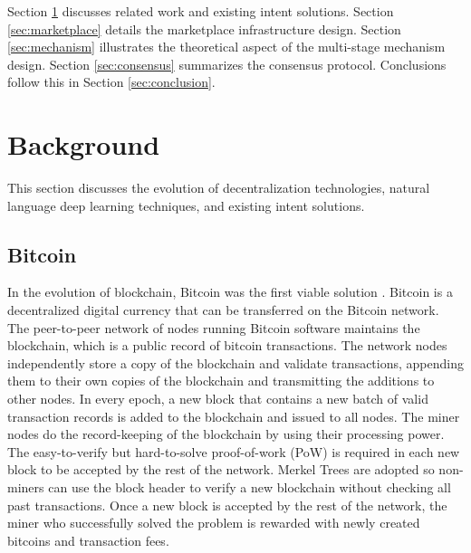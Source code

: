 \documentclass[11pt,letterpaper,twocolumn]{article}
\begin{document}
Section \ref{sec:background} discusses related work and existing intent solutions.
Section \ref{sec:marketplace} details the marketplace infrastructure design.
Section \ref{sec:mechanism} illustrates the theoretical aspect of the multi-stage mechanism
design. Section \ref{sec:consensus} summarizes the consensus protocol. Conclusions follow this in Section \ref{sec:conclusion}.

\section{Background}
\label{sec:background}
This section discusses the evolution of decentralization technologies, natural language deep learning techniques, and existing intent solutions. 

\subsection{Bitcoin}
In the evolution of blockchain, Bitcoin was the first viable solution \cite{nakamoto2008bitcoin}.
Bitcoin is a decentralized digital currency that can be transferred on the Bitcoin network. The peer-to-peer network of nodes running Bitcoin software maintains the blockchain, which is a public record of bitcoin transactions. The network nodes independently store a copy of the blockchain and validate transactions, appending them to their own copies of the blockchain and transmitting the additions to other nodes. In every epoch, a new block that contains a new batch of valid transaction records is added to the blockchain and issued to all nodes. The miner nodes do the record-keeping of the blockchain by using their processing power. The easy-to-verify but hard-to-solve proof-of-work (PoW) is required in each new block to be accepted by the rest of the network. Merkel Trees are adopted so non-miners can use the block header to verify a new blockchain without checking all past transactions. Once a new block is accepted by the rest of the network, the miner who successfully solved the problem is rewarded with newly created bitcoins and transaction fees.
\end{document}
